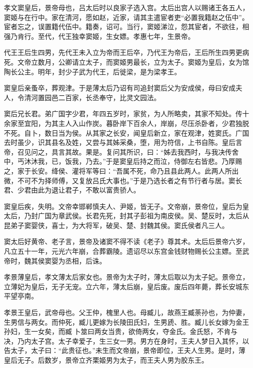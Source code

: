 \documentclass[12pt,UTF8]{ctexbook}
\begin{document}
孝文窦皇后，景帝母也，吕太后时以良家子选入宫。太后出宫人以赐诸王各五人，窦姬与在行中。家在清河，愿如赵，近家，请其主遣宦者吏“必置我籍赵之伍中”。宦者忘之，误置籍代伍中。籍奏，诏可。当行，窦姬涕泣，怨其宦者，不欲往，相强乃肯行。至代，代王独幸窦姬，生女嫖。孝惠七年，生景帝。



代王王后生四男，先代王未入立为帝而王后卒，乃代王为帝后，王后所生四男更病死。文帝立数月，公卿请立太子，而窦姬男最长，立为太子。窦姬为皇后，女为馆陶长公主。明年，封少子武为代王，后徙梁，是为梁孝王。



窦皇后亲蚤卒，葬观津。于是薄太后乃诏有司追封窦后父为安成侯，母曰安成夫人，令清河置园邑二百家，长丞奉守，比灵文园法。



窦后兄长君。弟广国字少君，年四五岁时，家贫，为人所略卖，其家不知处。传十余家至宜阳，为其主人入山作炭。暮卧岸下百余人，岸崩，尽压杀卧者，少君独脱不死。自卜，数日当为侯。从其家之长安，闻皇后新立，家在观津，姓窦氏。广国去时虽少，识其县名及姓，又尝与其姊采桑，堕，用为符信，上书自陈。皇后言帝，召见问之，具言其故。果是。复问其所识，曰：“姊去我西时，与我决传舍中，丐沐沐我，已，饭我，乃去。”于是窦皇后持之而泣，侍御左右皆悲。乃厚赐之，家于长安。绛侯、灌将军等曰：“吾属不死，命乃且县此两人。此两人所出微，不可不为择师傅，又复放吕氏大事也。”于是乃选长者之有节行者与居。窦长君、少君由此为退让君子，不敢以富贵骄人。



窦皇后疾，失明。文帝幸邯郸慎夫人、尹姬，皆无子。文帝崩，景帝位，皇后为皇太后，乃封广国为章武侯。长君先死，封其子彭祖为南皮侯。吴、楚反时，太后从昆弟子窦婴侠，喜士，为大将军，破吴、楚、封魏其侯。窦氏侯者凡三人。



窦太后好黄帝、老子言，景帝及诸窦不得不读《老子》尊其术。太后后景帝六岁，凡立五十一年，元光六年崩，合葬霸陵。遗诏尽以东宫金钱财物赐长公主嫖。至武帝时，魏其侯窦婴为丞相，后诛。



孝景薄皇后，孝文薄太后家女也。景帝为太子时，薄太后取以为太子妃。景帝立，立薄妃为皇后，无子无宠。立六年，薄太后崩，皇后废。废后四年薨，葬长安城东平望亭南。



孝景王皇后，武帝母也。父王仲，槐里人也。母臧儿，故燕王臧荼孙也，为仲妻，生男信与两女。而仲死，臧儿更嫁为长陵田氏妇，生男虒、胜。臧儿长女嫁为金王孙妇，生一女矣，而臧卜筮曰两女当贵，欲倚两女，夺金氏。金氏怒，不肯与决，乃内太子宫。太子幸爱子，生三女一男。男方在身时，王夫人梦日入其怀，以告太子，太子曰：“此贵征也。”未生而文帝崩，景帝即位，王夫人生男。是时，薄皇后无子。后数岁，景帝立齐栗姬男为太子，而王夫人男为胶东王。
\end{document}

